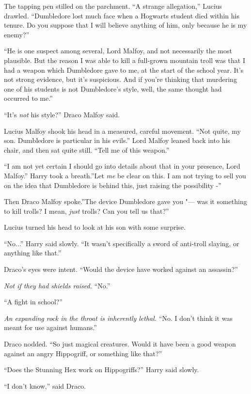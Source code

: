 The tapping pen stilled on the parchment. ``A strange allegation,''
Lucius drawled. ``Dumbledore lost much face when a Hogwarts student died
within his tenure. Do you suppose that I will believe anything of him,
only because he is my enemy?''

``He is one suspect among several, Lord Malfoy, and not necessarily the
most plausible. But the reason I was able to kill a full-grown mountain
troll was that I had a weapon which Dumbledore gave to me, at the start
of the school year. It's not strong evidence, but it's suspicious. And
if you're thinking that murdering one of his students is not
Dumbledore's style, well, the same thought had occurred to me.''

``It's \emph{not} his style?'' Draco Malfoy said.

Lucius Malfoy shook his head in a measured, careful movement. ``Not
quite, my son. Dumbledore is particular in his evils.'' Lord Malfoy
leaned back into his chair, and then sat quite still. ``Tell me of this
weapon.''

``I am not yet certain I should go into details about that in your
presence, Lord Malfoy.'' Harry took a breath.''Let \emph{me} be clear on
this. I am not trying to sell you on the idea that Dumbledore is behind
this, just raising the possibility -''

Then Draco Malfoy spoke.''The device Dumbledore gave you "--- was it
something to kill trolls? I mean, \emph{just} trolls? Can you tell us
that?''

Lucius turned his head to look at his son with some surprise.

``No...'' Harry said slowly. ``It wasn't specifically a sword of
anti-troll slaying, or anything like that.''

Draco's eyes were intent. ``Would the device have worked against an
assassin?''

\emph{Not if they had shields raised.} ``No.''

``A fight in school?''

\emph{An expanding rock in the throat is inherently lethal.} ``No. I
don't think it was meant for use against humans.''

Draco nodded. ``So just magical creatures. Would it have been a good
weapon against an angry Hippogriff, or something like that?''

``Does the Stunning Hex work on Hippogriffs?'' Harry said slowly.

``I don't know,'' said Draco.

